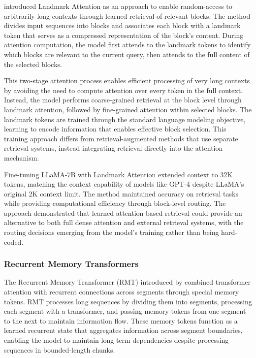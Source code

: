 \documentclass[11pt,letterpaper]{article}
\begin{document}
\cite{mohtashami2023landmark} introduced Landmark Attention as an approach to enable random-access to arbitrarily long contexts through learned retrieval of relevant blocks. The method divides input sequences into blocks and associates each block with a landmark token that serves as a compressed representation of the block's content. During attention computation, the model first attends to the landmark tokens to identify which blocks are relevant to the current query, then attends to the full content of the selected blocks.

This two-stage attention process enables efficient processing of very long contexts by avoiding the need to compute attention over every token in the full context. Instead, the model performs coarse-grained retrieval at the block level through landmark attention, followed by fine-grained attention within selected blocks. The landmark tokens are trained through the standard language modeling objective, learning to encode information that enables effective block selection. This training approach differs from retrieval-augmented methods that use separate retrieval systems, instead integrating retrieval directly into the attention mechanism.

Fine-tuning LLaMA-7B with Landmark Attention extended context to 32K tokens, matching the context capability of models like GPT-4 despite LLaMA's original 2K context limit. The method maintained accuracy on retrieval tasks while providing computational efficiency through block-level routing. The approach demonstrated that learned attention-based retrieval could provide an alternative to both full dense attention and external retrieval systems, with the routing decisions emerging from the model's training rather than being hard-coded.

\subsubsection{Recurrent Memory Transformers}

The Recurrent Memory Transformer (RMT) introduced by \cite{bulatov2022recurrent} combined transformer attention with recurrent connections across segments through special memory tokens. RMT processes long sequences by dividing them into segments, processing each segment with a transformer, and passing memory tokens from one segment to the next to maintain information flow. These memory tokens function as a learned recurrent state that aggregates information across segment boundaries, enabling the model to maintain long-term dependencies despite processing sequences in bounded-length chunks.
\end{document}
